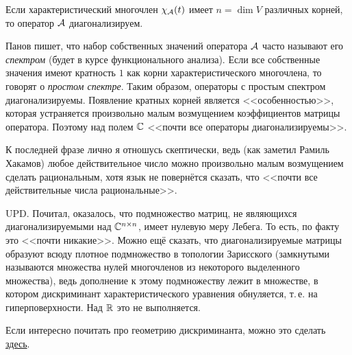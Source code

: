 \begin{corollary}
    Если характеристический многочлен $\chi_{\mathcal{A}}(t)$ имеет $n = \dim V$ различных корней, то оператор $\mathcal{A}$ диагонализируем.
\end{corollary}

\begin{remark}
    Панов пишет, что набор собственных значений оператора $\mathcal{A}$ часто называют его \textit{спектром} (будет в курсе функционального анализа). Если все собственные значения имеют кратность $1$ как корни характеристического многочлена, то говорят о \textit{простом спектре}. Таким образом, операторы с простым спектром диагонализируемы. Появление кратных корней является <<особенностью>>, которая устраняется произвольно малым возмущением коэффициентов матрицы оператора. Поэтому над полем $\mathbb{C}$ <<почти все операторы диагонализируемы>>.

    К последней фразе лично я отношусь скептически, ведь (как заметил Рамиль Хакамов) любое действительное число можно произвольно малым возмущением сделать рациональным, хотя язык не повернётся сказать, что <<почти все действительные числа рациональные>>.

    UPD. Почитал, оказалось, что подмножество матриц, не являющихся диагонализируемыми над $\mathbb{C}^{n \times n}$, имеет нулевую меру Лебега. То есть, по факту это <<почти никакие>>. Можно ещё сказать, что диагонализируемые матрицы образуют всюду плотное подмножество в топологии Зарисского (замкнутыми называются множества нулей многочленов из некоторого выделенного множества), ведь дополнение к этому подмножеству лежит в множестве, в котором дискриминант характеристического уравнения обнуляется, т.\,е. на гиперповерхности. Над $\mathbb{R}$ это не выполняется.

    Если интересно почитать про геометрию дискриминанта, можно это сделать \href{https://old.mccme.ru/free-books/mmmf-lectures/book.41.pdf}{здесь}.
\end{remark}

